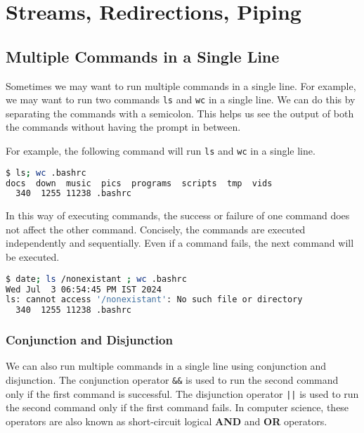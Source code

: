 \setchapterpreamble[u]{\margintoc}
\chapter{Streams, Redirections, Piping}

\section{Multiple Commands in a Single Line}

Sometimes we may want to run multiple commands in a single line.
For example, we may want to run two commands \texttt{ls} and \texttt{wc}
in a single line. We can do this by separating the commands with a semicolon.
This helps us see the output of both the commands without having the
prompt in between.

For example, the following command will run \texttt{ls} and \texttt{wc} in a single line.

\begin{lstlisting}[language=bash]
$ ls; wc .bashrc
docs  down  music  pics  programs  scripts  tmp  vids
  340  1255 11238 .bashrc
\end{lstlisting}

In this way of executing commands, the success or failure of one
command does not affect the other command. Concisely, the commands
are executed independently and sequentially. Even if a command
fails, the next command will be executed.

\begin{lstlisting}[language=bash]
$ date; ls /nonexistant ; wc .bashrc
Wed Jul  3 06:54:45 PM IST 2024
ls: cannot access '/nonexistant': No such file or directory
  340  1255 11238 .bashrc
\end{lstlisting}

\subsection{Conjunction and Disjunction}

We can also run multiple commands in a single line using conjunction
and disjunction. The conjunction operator \texttt{\&\&} is used to run
the second command only if the first command is successful. The disjunction
operator \texttt{||} is used to run the second command only if the first
command fails. In computer science, these operators are also known as
short-circuit logical \textbf{AND} and \textbf{OR} operators.

